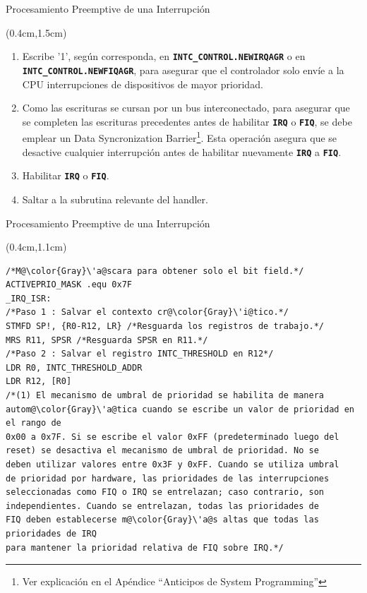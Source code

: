 \documentclass[usenames,table,xcolor={x11names},aspectratio=169]{beamer}
\newcounter{saveenumi}
\newcommand{\seti}{\setcounter{saveenumi}{\value{enumi}}}
\newcommand{\conti}{\setcounter{enumi}{\value{saveenumi}}}
\begin{document}
\begin{frame}[t,fragile]{Procesamiento Preemptive de una Interrupción}
 \begin{textblock*}{\textwidth}(0.4cm,1.5cm)
  \begin{enumerate}[<+->]\justifying \parskip 0.25cm
   \conti
   \item Escribe '1', según corresponda, en \texttt{\textbf{INTC\_CONTROL.NEWIRQAGR}} o en \texttt{\textbf{INTC\_CONTROL.NEWFIQAGR}}, para asegurar que el controlador solo envíe a la CPU interrupciones de dispositivos de mayor prioridad.
   \item Como las escrituras se cursan por un bus interconectado, para asegurar que se completen las escrituras precedentes antes de habilitar \texttt{\textbf{IRQ}} o \texttt{\textbf{FIQ}}, se debe emplear un Data Syncronization Barrier\footnote[1]{Ver explicación en el Apéndice ``Anticipos de System Programming''}. Esta operación asegura que se desactive cualquier interrupción antes de habilitar nuevamente \texttt{\textbf{IRQ}} a \texttt{\textbf{FIQ}}.
   \item Habilitar \texttt{\textbf{IRQ}} o \texttt{\textbf{FIQ}}.
   \item Saltar a la subrutina relevante del handler.
   \seti
  \end{enumerate}
 \end{textblock*}
\end{frame}

\begin{frame}[t,fragile]{Procesamiento Preemptive de una Interrupción}
 \begin{textblock*}{\textwidth}(0.4cm,1.1cm)
  \begin{lstlisting}[basicstyle=\scriptsize,escapechar=\@,numbers=none, frame=single, xleftmargin=20pt, xrightmargin=0pt,]
/*M@\color{Gray}\'a@scara para obtener solo el bit field.*/
ACTIVEPRIO_MASK .equ 0x7F
_IRQ_ISR:
/*Paso 1 : Salvar el contexto cr@\color{Gray}\'i@tico.*/
STMFD SP!, {R0-R12, LR} /*Resguarda los registros de trabajo.*/
MRS R11, SPSR /*Resguarda SPSR en R11.*/
/*Paso 2 : Salvar el registro INTC_THRESHOLD en R12*/
LDR R0, INTC_THRESHOLD_ADDR
LDR R12, [R0]
/*(1) El mecanismo de umbral de prioridad se habilita de manera 
autom@\color{Gray}\'a@tica cuando se escribe un valor de prioridad en el rango de 
0x00 a 0x7F. Si se escribe el valor 0xFF (predeterminado luego del 
reset) se desactiva el mecanismo de umbral de prioridad. No se 
deben utilizar valores entre 0x3F y 0xFF. Cuando se utiliza umbral 
de prioridad por hardware, las prioridades de las interrupciones 
seleccionadas como FIQ o IRQ se entrelazan; caso contrario, son 
independientes. Cuando se entrelazan, todas las prioridades de 
FIQ deben establecerse m@\color{Gray}\'a@s altas que todas las prioridades de IRQ 
para mantener la prioridad relativa de FIQ sobre IRQ.*/
  \end{lstlisting}
 \end{textblock*}
\end{frame}
\end{document}
